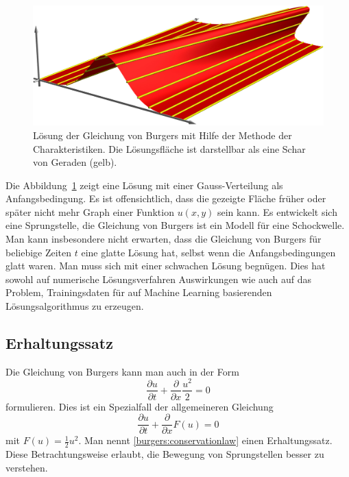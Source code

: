 \begin{figure}
\centering
\includegraphics[width=\hsize]{learning/welle.jpg}
\caption{Lösung der Gleichung von Burgers mit Hilfe der Methode
der Charakteristiken.
Die Lösungsfläche ist darstellbar als eine Schar von Geraden (gelb).
\label{burgers:charloesung}}
\end{figure}
Die Abbildung~\ref{burgers:charloesung} 
zeigt eine Lösung mit einer Gauss-Verteilung als Anfangsbedingung.
Es ist offensichtlich, dass die gezeigte Fläche früher oder später nicht
mehr Graph einer Funktion $u(x,y)$ sein kann.
Es entwickelt sich eine Sprungstelle, die Gleichung von Burgers ist
ein Modell für eine Schockwelle.
Man kann insbesondere nicht erwarten, dass die Gleichung von Burgers
für beliebige Zeiten $t$ eine glatte Lösung hat, selbst wenn die
Anfangsbedingungen glatt waren.
Man muss sich mit einer schwachen Lösung begnügen.
Dies hat sowohl auf numerische Lösungsverfahren Auswirkungen wie auch
auf das Problem, Trainingsdaten für auf Machine Learning basierenden
Lösungsalgorithmus zu erzeugen.

\subsection{Erhaltungssatz\label{subsection:erhaltungssatz}}
Die Gleichung von Burgers kann man auch in der Form
\begin{equation}
\frac{\partial u}{\partial t}
+
\frac{\partial}{\partial x} \frac{u^2}{2}
=
0
\label{burgers:erhaltungssatz}
\end{equation}
formulieren.
Dies ist ein Spezialfall der allgemeineren Gleichung
\begin{equation}
\frac{\partial u}{\partial t}
+
\frac{\partial }{\partial x} F(u)
=
0
\label{burgers:conservationlaw}
\end{equation}
mit $F(u)=\frac12u^2$.
Man nennt 
\eqref{burgers:conservationlaw}
einen Erhaltungssatz.
Diese Betrachtungsweise erlaubt, die Bewegung von Sprungstellen besser
zu verstehen.

